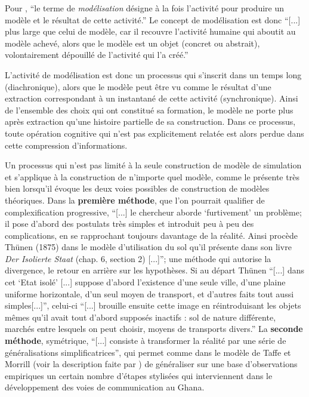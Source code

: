 Pour \textcite[36]{Langlois2005}, \enquote{le terme de \textit{modélisation} désigne à la fois l'activité pour produire un modèle et le résultat de cette activité.} Le concept de modélisation est donc \enquote{[...] plus large que celui de modèle, car il recouvre l'activité humaine qui aboutit au modèle achevé, alors que le modèle est un objet (concret ou abstrait), volontairement dépouillé de l'activité qui l'a créé.} 


L'activité de modélisation est donc un processus qui s'inscrit dans un temps long (diachronique), alors que le modèle peut être vu comme le résultat d'une extraction correspondant à un instantané de cette activité (synchronique). Ainsi de l'ensemble des choix qui ont constitué sa formation, le modèle ne porte plus après extraction qu'une histoire partielle de sa construction. Dans ce processus, toute opération cognitive qui n'est pas explicitement relatée est alors perdue dans cette compression d'informations.


Un processus qui n'est pas limité à la seule construction de modèle de simulation et s'applique à la construction de n'importe quel modèle, comme le présente très bien \textcite[32-33]{Haggett1965} lorsqu'il évoque les deux voies possibles de construction de modèles théoriques. Dans la \textbf{première méthode}, que l'on pourrait qualifier de complexification progressive, \enquote{[...] le chercheur aborde \enquote{furtivement} un problème; il pose d'abord des postulats très simples et introduit peu à peu des complications, en se rapprochant toujours davantage de la réalité. Ainsi procède Thünen (1875) dans le modèle d'utilisation du sol qu'il présente dans son livre \textit{Der Isolierte Staat} (chap. 6, section 2) [...]}; une méthode qui autorise la divergence, le retour en arrière sur les hypothèses. Si au départ Thünen \enquote{[...] dans cet \enquote{Etat isolé} [...] suppose d'abord l'existence d'une seule ville, d'une plaine uniforme horizontale, d'un seul moyen de transport, et d'autres faits tout aussi simples[...]}, celui-ci \enquote{[...] brouille ensuite cette image en réintroduisant les objets mêmes qu'il avait tout d'abord supposés inactifs : sol de nature différente, marchés entre lesquels on peut choisir, moyens de transports divers.} La \textbf{seconde méthode}, symétrique, \enquote{[...] consiste à transformer la réalité par une série de généralisations simplificatrices}, qui permet comme dans le modèle de Taffe et Morrill (voir la description faite par \textcite[93-96]{Haggett1965}) de généraliser sur une base d'observations empiriques un certain nombre d'étapes stylisées qui interviennent dans le développement des voies de communication au Ghana.

